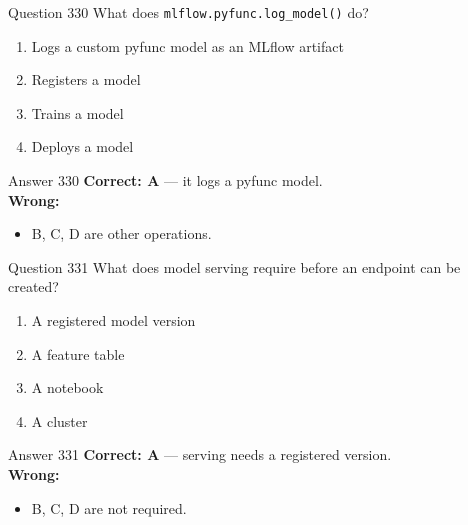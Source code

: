\documentclass[aspectratio=169,11pt]{beamer}
\begin{document}
	\begin{frame}{Question 330}
		What does \texttt{mlflow.pyfunc.log\_model()} do?
		\begin{enumerate}[label=\Alph*.]
			\item Logs a custom pyfunc model as an MLflow artifact
			\item Registers a model
			\item Trains a model
			\item Deploys a model
		\end{enumerate}
	\end{frame}
	\begin{frame}{Answer 330}
		\textbf{Correct: A} --- it logs a pyfunc model.\\
		\vspace{0.5em}
		\textbf{Wrong:}
		\begin{itemize}
			\item B, C, D are other operations.
		\end{itemize}
	\end{frame}
	
	\begin{frame}{Question 331}
		What does model serving require before an endpoint can be created?
		\begin{enumerate}[label=\Alph*.]
			\item A registered model version
			\item A feature table
			\item A notebook
			\item A cluster
		\end{enumerate}
	\end{frame}
	\begin{frame}{Answer 331}
		\textbf{Correct: A} --- serving needs a registered version.\\
		\vspace{0.5em}
		\textbf{Wrong:}
		\begin{itemize}
			\item B, C, D are not required.
		\end{itemize}
	\end{frame}
	
\end{document}
